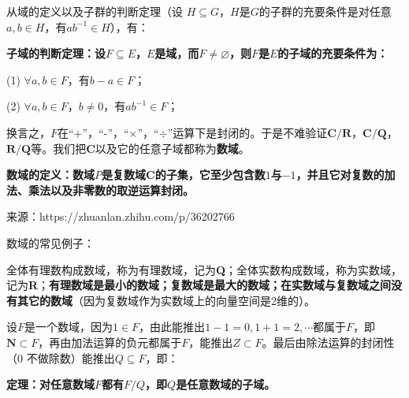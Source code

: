 \documentclass[12pt]{article}
\begin{document}
从域的定义以及子群的判断定理（设 $H \subseteq G$，$H$是$G$的子群的充要条件是对任意$a, b \in H$，有$ab^{-1} \in H$），有：
\begin{mdframed}[
linecolor=black!40,outerlinewidth=1pt,roundcorner=.5em,innertopmargin=1ex,innerbottommargin=.5\baselineskip,innerrightmargin=1em,innerleftmargin=1em,backgroundcolor=gray!5,
]
\textbf{
子域的判断定理：设$F \subseteq E$，$E$是域，而$F \neq \varnothing$，则$F$是$E$的子域的充要条件为：}

(1) $\forall a, b \in F$，有$b - a \in F$；

(2) $\forall a, b \in F$，$b\neq 0$，有$ab^{-1} \in F$；
\end{mdframed}

换言之，$F$在“+”，“-”，“$\times$”，“$\div$”运算下是封闭的。于是不难验证$\textbf{C}/\textbf{R}$，$\textbf{C}/\textbf{Q}$，$\textbf{R}/\textbf{Q}$等。我们把$\textbf{C}$以及它的任意子域都称为\textbf{数域}。

\begin{mdframed}[
linecolor=black!40,outerlinewidth=1pt,roundcorner=.5em,innertopmargin=1ex,innerbottommargin=.5\baselineskip,innerrightmargin=1em,innerleftmargin=1em,backgroundcolor=gray!5,
]
\textbf{
数域的定义：数域$P$是复数域C的子集，它至少包含数$1$与$-1$，并且它对复数的加法、乘法以及非零数的取逆运算封闭。
}

来源：https://zhuanlan.zhihu.com/p/36202766
\end{mdframed}

\begin{framed}
\small{
数域的常见例子：

全体有理数构成数域，称为有理数域，记为\textbf{Q}；全体实数构成数域，称为实数域，记为\textbf{R}；\textbf{有理数域是最小的数域；复数域是最大的数域；在实数域与复数域之间没有其它的数域}（因为复数域作为实数域上的向量空间是2维的）。
}
\end{framed}


设$F$是一个数域，因为$1 \in F$，由此能推出$1 - 1 = 0, 1 + 1 = 2, \cdots$都属于$F$，即$\textbf{N} \subset F$，再由加法运算的负元都属于$F$，能推出$Z \subset F$。最后由除法运算的封闭性（0 不做除数）能推出$Q \subseteq F$，即：
\begin{mdframed}[
linecolor=black!40,outerlinewidth=1pt,roundcorner=.5em,innertopmargin=1ex,innerbottommargin=.5\baselineskip,innerrightmargin=1em,innerleftmargin=1em,backgroundcolor=gray!5,
]
\textbf{
定理：对任意数域$F$都有$F/Q$，即$Q$是任意数域的子域。
}
\end{mdframed}
\end{document}
